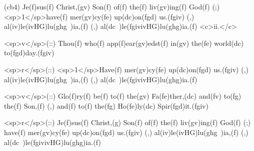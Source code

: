 (cb4) Je(f)sus(f) Christ,(gv) Son(f) of(f) the(f) liv(gv)ing(f) God(f) (;) <sp>1</sp>have(f) mer(gv)cy(fe) up(dc)on(fgd) us.(fgiv) (,) al(iv)le(ivHG)lu(ghg~)ia,(f) (,) al(dc~)le(fgivivHG)lu(ghg)ia.(f) <c>ii.</c>

<sp>v</sp>(::) Thou(f) who(f) app(f)ear(gv)edst(f) in(gv) the(fe) world(dc) to(fgd)day.(fgiv)

<sp>r</sp>(::) <sp>1</sp>Have(f) mer(gv)cy(fe) up(dc)on(fgd) us.(fgiv) (,) al(iv)le(ivHG)lu(ghg~)ia,(f) (,) al(dc~)le(fgivivHG)lu(ghg)ia.(f)

<sp>v</sp>(::) Glo(f)ry(f) be(f) to(f) the(gv) Fa(fe)ther,(dc) and(fv) to(fg) the(f) Son,(f) (,) and(f) to(f) the(fg) Ho(fe)ly(dc) Spir(fgd)it.(fgiv) 

<sp>r</sp>(::) Je(f)sus(f) Christ,(g) Son(f) of(f) the(f) liv(gv)ing(f) God(f) (;) have(f) mer(gv)cy(fe) up(dc)on(fgd) us.(fgiv) (,) al(iv)le(ivHG)lu(ghg~)ia,(f) (,) al(dc~)le(fgivivHG)lu(ghg)ia.(f)